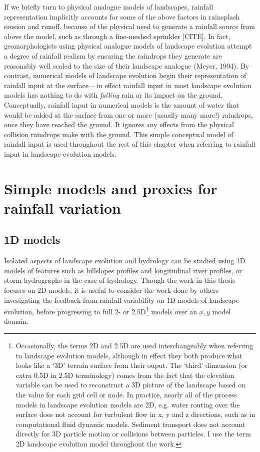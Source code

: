 \documentclass[12pt,oneside,PhD]{muthesis}
\begin{document}
If we briefly turn to physical analogue models of landscapes, rainfall representation implicitly accounts for some of the above factors in rainsplash erosion and runoff, because of the physical need to generate a rainfall source from above the model, such as through a fine-meshed sprinkler [CITE]. In fact, geomorphologists using physical analogue models of landscape evolution attempt a degree of rainfall realism by ensuring the raindrops they generate are reasonably well scaled to the size of their landscape analogue (Meyer, 1994). By contrast, numerical models of landscape evolution begin their representation of rainfall input at the surface -- in effect rainfall input in most landscape evolution models has nothing to do with \textit{falling} rain or its impact on the ground. Conceptually, rainfall input in numerical models is the amount of water that would be added at the surface from one or more (usually many more!) raindrops, once they have reached the ground. It ignores any effects from the physical collision raindrops make with the ground. This simple conceptual model of rainfall input is used throughout the rest of this chapter when referring to rainfall input in landscape evolution models.

\section{Simple models and proxies for rainfall variation}

\subsection{1D models}
Isolated aspects of landscape evolution and hydrology can be studied using 1D models of features such as hillslopes profiles and longitudinal river profiles, or storm hydrographs in the case of hydrology. Though the work in this thesis focuses on 2D models, it is useful to consider the work done by others invesigating the feedback from rainfall variability on 1D models of landscape evolution, before progressing to full 2- or 2.5D\footnote{Occasionally, the terms 2D and 2.5D are used interchangeably when referring to landscape evolution models, although in effect they both produce what looks like a `3D' terrain surface from their ouput. The `third' dimension (or extra 0.5D in 2.5D terminology) comes from the fact that the elevation variable can be used to reconstruct a 3D picture of the landscape based on the value for each grid cell or node. In practice, nearly all of the process models in landscape evolution models are 2D, e.g. water routing over the surface does not account for turbulent flow in x, y and z directions, such as in computational fluid dynamic models. Sediment transport does not account directly for 3D particle motion or collisions between particles. I use the term 2D landscape evolution model throughout the work.} models over an \(x,y\) model domain. 
\end{document}
